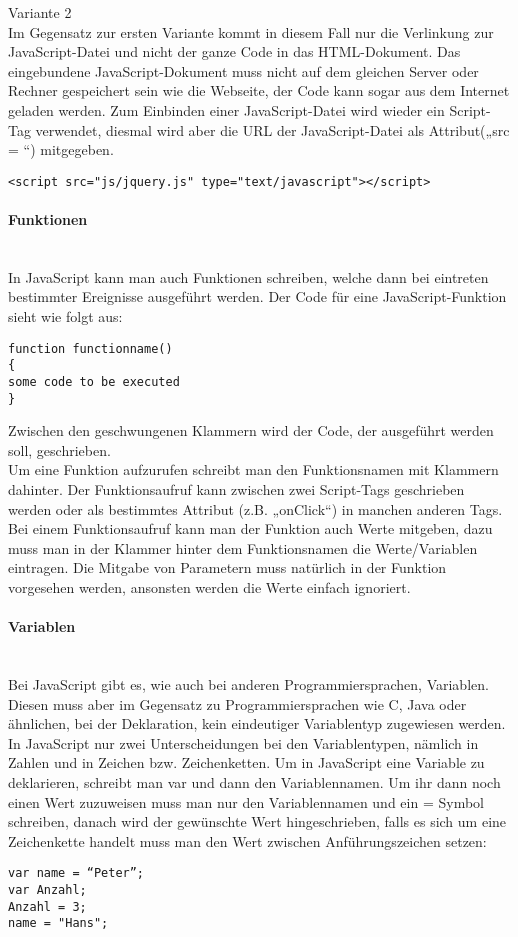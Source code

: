 Variante 2\\
Im Gegensatz zur ersten Variante kommt in diesem Fall nur die Verlinkung zur JavaScript-Datei und nicht der ganze Code in das HTML-Dokument. Das eingebundene JavaScript-Dokument muss nicht auf dem gleichen Server oder Rechner gespeichert sein wie die Webseite, der Code kann sogar aus dem Internet geladen werden. Zum Einbinden einer JavaScript-Datei wird wieder ein Script-Tag verwendet, diesmal wird aber die URL der JavaScript-Datei als Attribut(„src = “) mitgegeben.\\
\begin{lstlisting}
<script src="js/jquery.js" type="text/javascript"></script>
\end{lstlisting}

\paragraph{Funktionen}\\
In JavaScript kann man auch Funktionen schreiben, welche dann bei eintreten bestimmter Ereignisse ausgeführt werden. Der Code für eine JavaScript-Funktion sieht wie folgt aus:\\
\begin{lstlisting}
function functionname()
{
some code to be executed
}
\end{lstlisting}
Zwischen den geschwungenen Klammern wird der Code, der ausgeführt werden soll, geschrieben.\\
Um eine Funktion aufzurufen schreibt man den Funktionsnamen mit Klammern dahinter. Der Funktionsaufruf kann zwischen zwei Script-Tags geschrieben werden oder als bestimmtes Attribut (z.B. „onClick“) in manchen anderen Tags.\\
Bei einem Funktionsaufruf kann man der Funktion auch Werte mitgeben, dazu muss man in der Klammer hinter dem Funktionsnamen die Werte/Variablen eintragen. Die Mitgabe von Parametern muss natürlich in der Funktion vorgesehen werden, ansonsten werden die Werte einfach ignoriert.\\

\paragraph{Variablen}\\
Bei JavaScript gibt es, wie auch bei anderen Programmiersprachen, Variablen. Diesen muss aber im Gegensatz zu Programmiersprachen wie C, Java oder ähnlichen, bei der Deklaration, kein eindeutiger Variablentyp zugewiesen werden. In JavaScript nur zwei Unterscheidungen bei den Variablentypen, nämlich in Zahlen und in Zeichen bzw. Zeichenketten. 
Um in JavaScript eine Variable zu deklarieren, schreibt man var und dann den Variablennamen. Um ihr dann noch einen Wert zuzuweisen muss man nur den Variablennamen und ein = Symbol schreiben, danach wird der gewünschte Wert hingeschrieben, falls es sich um eine Zeichenkette handelt muss man den Wert zwischen Anführungszeichen setzen:\\
\begin{lstlisting} 
var name = “Peter”;
var Anzahl;
Anzahl = 3;
name = "Hans";
\end{lstlisting}

